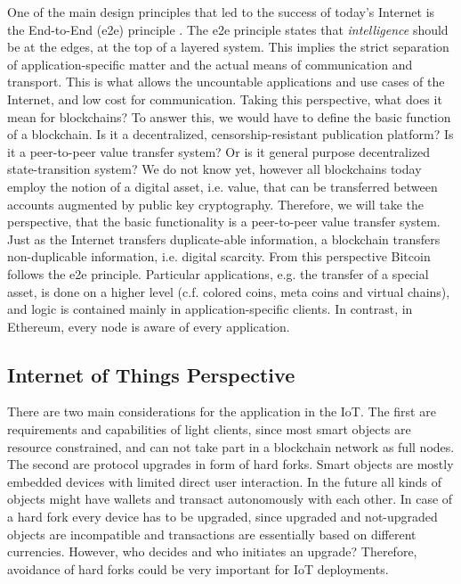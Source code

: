 One of the main design principles that led to the success of today's Internet is the End-to-End (e2e) principle \parencite{Saltzer:1984:EAS:357401.357402}. The e2e principle states that \emph{intelligence} should be at the edges, at the top of a layered system. This implies the strict separation of application-specific matter and the actual means of communication and transport. This is what allows the uncountable applications and use cases of the Internet, and low cost for communication. Taking this perspective, what does it mean for blockchains? To answer this, we would have to define the basic function of a blockchain. Is it a decentralized, censorship-resistant publication platform? Is it a peer-to-peer value transfer system? Or is it general purpose decentralized state-transition system? We do not know yet, however all blockchains today employ the notion of a digital asset, i.e. value, that can be transferred between accounts augmented by public key cryptography. Therefore, we will take the perspective, that the basic functionality is a peer-to-peer value transfer system. Just as the Internet transfers duplicate-able information, a blockchain transfers non-duplicable information, i.e. digital scarcity. From this perspective Bitcoin follows the e2e principle. Particular applications, e.g. the transfer of a special asset, is done on a higher level (c.f. colored coins, meta coins and virtual chains), and logic is contained mainly in application-specific clients. In contrast, in Ethereum, every node is aware of every application.



\subsection{Internet of Things Perspective}

There are two main considerations for the application in the IoT. The first are requirements and capabilities of light clients, since most smart objects are resource constrained, and can not take part in a blockchain network as full nodes. The second are protocol upgrades in form of hard forks. Smart objects are mostly embedded devices with limited direct user interaction. In the future all kinds of objects might have wallets and transact autonomously with each other. In case of a hard fork every device has to be upgraded, since upgraded and not-upgraded objects are incompatible and transactions are essentially based on different currencies. However, who decides and who initiates an upgrade? Therefore, avoidance of hard forks could be very important for IoT deployments.


